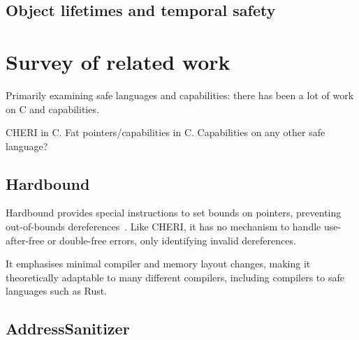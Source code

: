 \documentclass[dissertation.tex]{subfiles}
\begin{document}
\subsection{Object lifetimes and temporal safety}


\section{Survey of related work}
\label{sec:bg-related}

Primarily examining safe languages and capabilities: there has been a
lot of work on C and capabilities.


CHERI in C.
Fat pointers/capabilities in C.
Capabilities on any other safe language?






\subsection{Hardbound}
\label{sec:rel-hardbound}

Hardbound provides special instructions to set bounds on pointers,
preventing out-of-bounds dereferences~\cite{devietti-hardbound}.
Like CHERI, it has no mechanism to handle use-after-free or double-free
errors, only identifying invalid dereferences.

It emphasises minimal compiler and memory layout changes, making it
theoretically adaptable to many different compilers, including compilers
to safe languages such as Rust.



\subsection{AddressSanitizer}
\label{sec:rel-asan}
\end{document}
